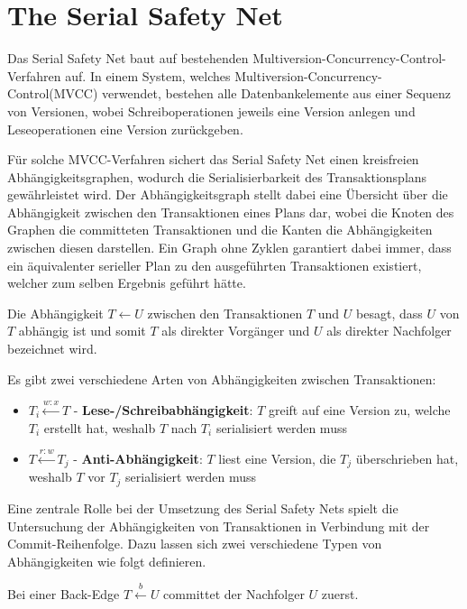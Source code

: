 \section{The Serial Safety Net}
\label{sec:ssn}

Das Serial Safety Net baut auf bestehenden Multiversion-Concurrency-Control-Verfahren auf.
In einem System, welches Multiversion-Concurrency-Control(MVCC) verwendet, bestehen alle Datenbankelemente aus einer Sequenz von Versionen, wobei Schreiboperationen jeweils eine Version anlegen und Leseoperationen eine Version zurückgeben.

Für solche MVCC-Verfahren sichert das Serial Safety Net einen kreisfreien Abhängigkeitsgraphen, wodurch die Serialisierbarkeit des Transaktionsplans gewährleistet wird.
Der Abhängigkeitsgraph stellt dabei eine Übersicht über die Abhängigkeit zwischen den Transaktionen eines Plans dar, wobei die Knoten des Graphen die committeten Transaktionen und die Kanten die Abhängigkeiten zwischen diesen darstellen.
Ein Graph ohne Zyklen garantiert dabei immer, dass ein äquivalenter serieller Plan zu den ausgeführten Transaktionen existiert, welcher zum selben Ergebnis geführt hätte.

\begin{Definition}
	Die Abhängigkeit $T\leftarrow U$ zwischen den Transaktionen $T$ und $U$ besagt, dass $U$ von $T$ abhängig ist und somit $T$ als direkter Vorgänger und $U$ als direkter Nachfolger bezeichnet wird.
\end{Definition}

Es gibt zwei verschiedene Arten von Abhängigkeiten zwischen Transaktionen:
\begin{itemize}
	\item $T_i\xleftarrow{w:x}T$ - \textbf{Lese-/Schreibabhängigkeit}: $T$ greift auf eine Version zu, welche $T_i$ erstellt hat, weshalb $T$ nach $T_i$ serialisiert werden muss
	\item $T\xleftarrow{r:w}T_j$ - \textbf{Anti-Abhängigkeit}: $T$ liest eine Version, die $T_j$ überschrieben hat, weshalb $T$ vor $T_j$ serialisiert werden muss
\end{itemize}

Eine zentrale Rolle bei der Umsetzung des Serial Safety Nets spielt die Untersuchung der Abhängigkeiten von Transaktionen in Verbindung mit der Commit-Reihenfolge.
Dazu lassen sich zwei verschiedene Typen von Abhängigkeiten wie folgt definieren.

\begin{Definition}
	Bei einer \textcolor{my-green}{Back-Edge} $T\xleftarrow{b} U$ committet der Nachfolger $U$ zuerst.
\end{Definition}

